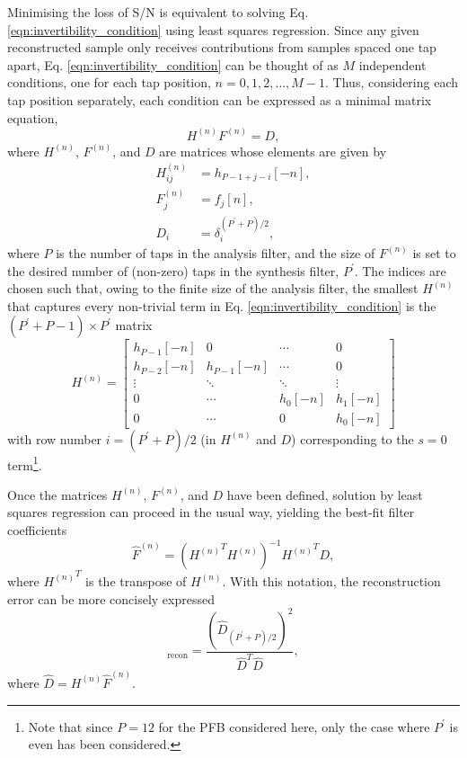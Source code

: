 \documentclass{pasa}%
\begin{document}
Minimising the loss of S/N is equivalent to solving Eq. \eqref{eqn:invertibility_condition} using least squares regression.
Since any given reconstructed sample only receives contributions from samples spaced one tap apart, Eq. \eqref{eqn:invertibility_condition} can be thought of as $M$ independent conditions, one for each tap position, $n = 0, 1, 2, \dots, M-1$.
Thus, considering each tap position separately, each condition can be expressed as a minimal matrix equation,
\begin{equation}
    H^{(n)}F^{(n)} = D,
\end{equation}
where $H^{(n)}$, $F^{(n)}$, and $D$ are matrices whose elements are given by
\begin{equation}
    \begin{aligned}
        H^{(n)}_{ij} &= h_{P-1+j-i}[-n], \\
        F^{(n)}_j    &= f_j[n], \\
        D_i          &= \delta^{(P^\prime+P)/2}_i,
    \end{aligned}
\end{equation}
where $P$ is the number of taps in the analysis filter, and the size of $F^{(n)}$ is set to the desired number of (non-zero) taps in the synthesis filter, $P^\prime$.
The indices are chosen such that, owing to the finite size of the analysis filter, the smallest $H^{(n)}$ that captures every non-trivial term in Eq. \eqref{eqn:invertibility_condition} is the $(P^\prime+P-1) \times P^\prime$ matrix
\begin{equation}
    H^{(n)} =
    \begin{bmatrix}
       h_{P-1}[-n] & 0 & \cdots & 0 \\
       h_{P-2}[-n] & h_{P-1}[-n] & \cdots & 0 \\
       \vdots & \ddots & \ddots & \vdots \\
       0 & \cdots & h_0[-n] & h_1[-n] \\
       0 & \cdots & 0 & h_0[-n]
    \end{bmatrix}
\end{equation}
with row number $i = (P^\prime + P)/2$ (in $H^{(n)}$ and $D$) corresponding to the $s = 0$ term\footnote{Note that since $P = 12$ for the PFB considered here, only the case where $P^\prime$ is even has been considered.}.

Once the matrices $H^{(n)}$, $F^{(n)}$, and $D$ have been defined, solution by least squares regression can proceed in the usual way, yielding the best-fit filter coefficients
\begin{equation}
    \hat{F}^{(n)} = \left({H^{(n)}}^T H^{(n)}\right)^{-1} {H^{(n)}}^T D,
\end{equation}
where ${H^{(n)}}^T$ is the transpose of $H^{(n)}$.
With this notation, the reconstruction error can be more concisely expressed
\begin{equation}
    [\text{S/N}]_\text{recon}
      = \frac{(\hat{D}_{(P^\prime+P)/2})^2}{\hat{D}^T \hat{D}},
    \label{eqn:snr_short}
\end{equation}
where $\hat{D} = H^{(n)} \hat{F}^{(n)}$.
\end{document}
